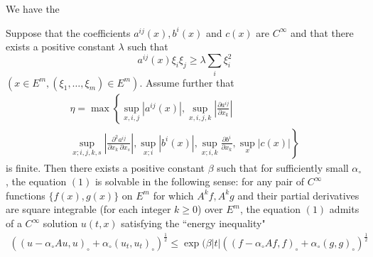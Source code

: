  We have the
\begin{theorem*}
  Suppose that the coefficients $a^{ij}(x), b^i(x)$ and $c(x)$ are
  $C^\infty$ and that there exists a positive constant $\lambda$
  such that 
  $$
  a^{ij}(x) \xi_i \xi_j \geq \lambda \sum_i \xi^2_i
  $$
  $(x \in E^m, (\xi_1, \ldots, \xi_m) \in E^m)$. Assume further that
  \begin{multline*}
   \eta = \max \left\{\sup_{x,i,j}| a^{ij}(x)|, \sup_{x,i,j,k} \left
   |\frac{\partial a^{ij}}{\partial x_k} \right|\right.\\
   \left. \sup_{x;i,j,k,s} \left|\frac{\partial^2 a^{ij}}{\partial x_k ~
    \partial x_s} \right|, \sup_{x;i} | b^i (x)|, \sup_{x;i,k}
   \frac{\partial b^i}{\partial x_k}, \sup_x | c(x)| \right\} 
  \end{multline*}
  is finite. Then there exists a positive constant $\beta$ such that for
  sufficiently small $\alpha_\circ$, the equation $(1)$ is solvable in
  the following sense: for any pair of $C^\infty$ functions $\big\{f(x),
  g(x)\big\}$ on $E^m$ for which $A^k f, A^k g$ and their partial
  derivatives are square integrable (for each integer $k \geq 0$) over
  $E^m$, the equation $(1)$ admits of a $C^\infty$ solution $u(t, x)$
  satisfying the ``energy inequality" 
  \begin{gather*}
   ((u - \alpha_\circ A u, u)_\circ + \alpha_\circ (u_t, u_t)_\circ
   )^{\frac{1}{2}}
   \leq \exp ( \beta |t| ((f-\alpha_\circ A f, f)_\circ + \alpha_\circ
   (g, g)_\circ )^{\frac{1}{2}} 
  \end{gather*}
\end{theorem*}
 
